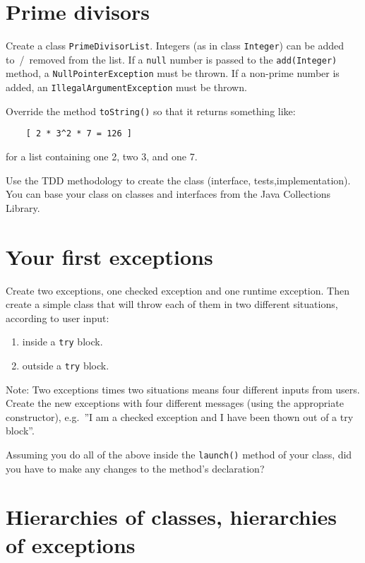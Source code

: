 \documentclass{article}
\begin{document}
\section{Prime divisors}
\label{sec:list-without-null}

Create a class \verb+PrimeDivisorList+. Integers (as in class
\verb+Integer+) can be added to~/~removed from the list. If a
\verb+null+ number is
passed to the \verb+add(Integer)+ method, a
\verb+NullPointerException+ must be thrown. If a non-prime number is
added, an \verb+IllegalArgumentException+ must be thrown. 

Override the method \verb+toString()+ so that it returns something
like:

\begin{verbatim}
    [ 2 * 3^2 * 7 = 126 ]
\end{verbatim}

for a list containing one 2, two 3, and one 7. 

Use the TDD methodology to create the class (interface,
tests,implementation).  
You can base your class on classes and interfaces from the Java
Collections Library.

\section{Your first exceptions}
\label{sec:your-first-exception}

Create two exceptions, one checked exception and one runtime
exception. Then create a simple class that will throw each of them in
two different situations, according to user input: 

\begin{enumerate}
\item inside a \verb+try+ block.
\item outside a \verb+try+ block.
\end{enumerate}

Note: Two exceptions times two situations means four different inputs from
users. Create the new exceptions with four different messages (using
the appropriate constructor), e.g.~''I am a checked exception and I
have been thown out of a try block''. 

Assuming you do all of the above inside the \verb+launch()+ method of
your class, did you have to make any changes to the method's
declaration? 

\section{Hierarchies of classes, hierarchies of exceptions}
\label{sec:hier-class-hier}
\end{document}
